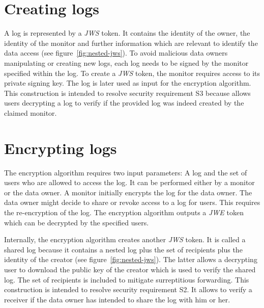 \documentclass[../main.tex]{subfiles}
\begin{document}
\section{Creating logs}
\label{sec:signing}
A log is represented by a \textit{JWS} token.
It contains the identity of the owner, the identity of the monitor and further information which are relevant to identify the data access (see figure~\ref{fig:nested-jws}).
To avoid malicious data owners manipulating or creating new logs, each log needs to be signed by the monitor specified within the log.
To create a \textit{JWS} token, the monitor requires access to its private signing key.
The log is later used as input for the encryption algorithm.
This construction is intended to resolve security requirement S3 because allows users decrypting a log to verify if the provided log was indeed created by the claimed monitor.

\section{Encrypting logs}\label{sec:encrypting}

The encryption algorithm requires two input parameters: A log and the set of users who are allowed to access the log.
It can be performed either by a monitor or the data owner.
A monitor initially encrypts the log for the data owner.
The data owner might decide to share or revoke access to a log for users.
This requires the re-encryption of the log.
The encryption algorithm outputs a \textit{JWE} token which can be decrypted by the specified users.

Internally, the encryption algorithm creates another \textit{JWS} token.
It is called a shared log because it contains a nested log plus the set of recipients plus the identity of the creator (see figure~\ref{fig:nested-jws}).
The latter allows a decrypting user to download the public key of the creator which is used to verify the shared log.
The set of recipients is included to mitigate surreptitious forwarding.
This construction is intended to resolve security requirement S2.
It allows to verify a receiver if the data owner has intended to share the log with him or her.
 
\end{document}
